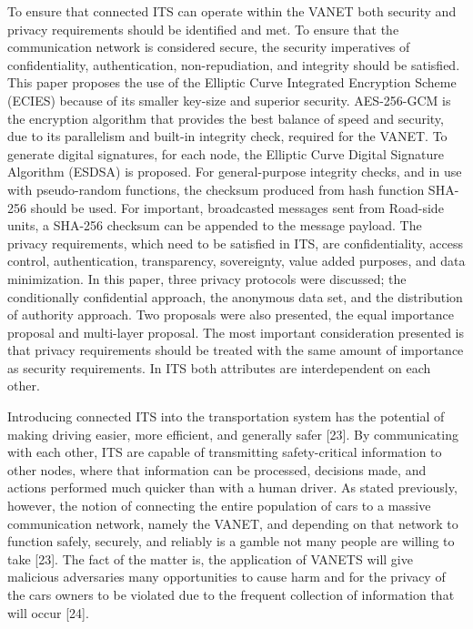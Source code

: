\documentclass[conference,compsoc]{IEEEtran}
\begin{document}
To ensure that connected ITS can operate within the VANET both security and privacy requirements should be identified and met.	
To ensure that the communication network is considered secure, the security imperatives of confidentiality, authentication, non-repudiation, and integrity should be satisfied. This paper proposes the use of the Elliptic Curve Integrated Encryption Scheme (ECIES) because of its smaller key-size and superior security. AES-256-GCM is the encryption algorithm that provides the best balance of speed and security, due to its parallelism and built-in integrity check, required for the VANET. To generate digital signatures, for each node, the Elliptic Curve Digital Signature Algorithm (ESDSA) is proposed. For general-purpose integrity checks, and in use with pseudo-random functions, the checksum produced from hash function SHA-256 should be used. For important, broadcasted messages sent from Road-side units, a SHA-256 checksum can be appended to the message payload.
The privacy requirements, which need to be satisfied in ITS, are confidentiality, access control, authentication, transparency, sovereignty, value added purposes, and data minimization. In this paper, three privacy protocols were discussed; the conditionally confidential approach, the anonymous data set, and the distribution of authority approach. Two proposals were also presented, the equal importance proposal and multi-layer proposal. The most important consideration presented is that privacy requirements should be treated with the same amount of importance as security requirements. In ITS both attributes are interdependent on each other. 

Introducing connected ITS into the transportation system has the potential of making driving easier, more efficient, and generally safer [23]. By communicating with each other, ITS are capable of transmitting safety-critical information to other nodes, where that information can be processed, decisions made, and actions performed much quicker than with a human driver.  As stated previously, however, the notion of connecting the entire population of cars to a massive communication network, namely the VANET, and depending on that network to function safely, securely, and reliably is a gamble not many people are willing to take [23]. The fact of the matter is, the application of VANETS will give malicious adversaries many opportunities to cause harm and for the privacy of the cars owners to be violated due to the frequent collection of information that will occur [24]. 
\end{document}
